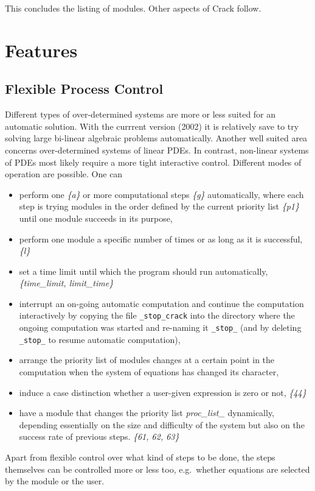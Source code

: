 \documentclass[12pt]{article}
\begin{document}
  This concludes the listing of modules. Other aspects of {\sc Crack} follow.

\section{Features}

\subsection{Flexible Process Control}
  Different types of over-determined systems are more or less suited
  for an automatic solution. With the currrent version (2002)
  it is relatively save to try solving large bi-linear algebraic problems
  automatically. Another well suited area concerns over-determined systems
  of linear PDEs. In contrast, non-linear systems of PDEs most likely
  require a more tight interactive control. Different modes of
  operation are possible. One can
  \begin{itemize}
  \item perform one {\em\{a\}} or more computational steps {\em\{g\}}
    automatically, where each step is trying modules in the order defined by the
    current priority list {\em \{p1\} } until one module succeeds in
    its purpose,
  \item
    perform one module a specific number of times or as long as it is
    successful, {\em \{l\} }
  \item
    set a time limit until which the program should run automatically,
    {\em \{time\_limit, limit\_time\} }
  \item
    interrupt an on-going automatic computation and continue the
    computation interactively by copying the file
    {\tt \_stop\_crack} into the directory where the ongoing
    computation was started and re-naming it {\tt \_stop\_}
    (and by deleting {\tt \_stop\_} to resume automatic computation),
  \item
    arrange the priority list of modules changes
    at a certain point in the computation when the system of equations
    has changed its character,
  \item
    induce a case distinction whether a user-given expression
    is zero or not, {\em \{44\} }
  \item
    have a module that changes the priority list {\em proc\_list\_}
    dynamically, depending essentially on the size and difficulty
    of the system but also on the success rate of previous steps.
    {\em \{61, 62, 63\} }
  \end{itemize}
  Apart from flexible control over what kind of steps to be done, the
  steps themselves can be controlled more or less too, e.g.\ whether
  equations are selected by the module or the user.
\end{document}

